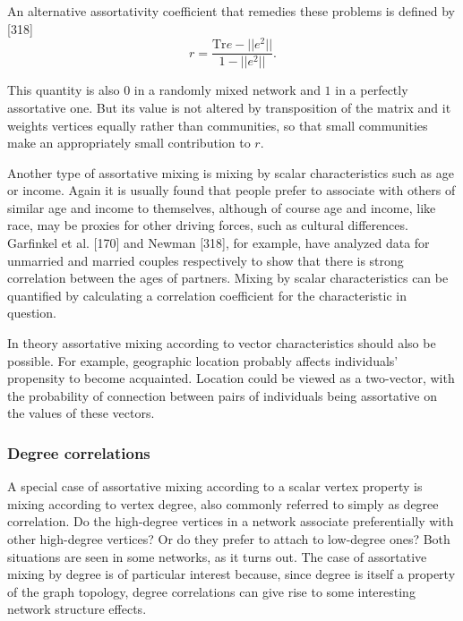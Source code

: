       An alternative assortativity coefficient that remedies these problems is defined by [318]
      \begin{equation}
        r = \frac{\mbox{Tr}e - ||e^2||}{1 - ||e^2||}\mbox{.}
      \end{equation}

      This quantity is also $0$ in a randomly mixed network and $1$ in a perfectly assortative one. But its value is not altered by transposition of the matrix and it weights vertices equally rather than communities, so that small communities make an appropriately small contribution to $r$.
      
      Another type of assortative mixing is mixing by scalar characteristics such as age or income. Again it is usually found that people prefer to associate with others of similar age and income to themselves, although of course age and income, like race, may be proxies for other driving forces, such as cultural differences. Garfinkel et al. [170] and Newman [318], for example, have analyzed data for unmarried and married couples respectively to show that there is strong correlation between the ages of partners. Mixing by scalar characteristics can be quantified by calculating a correlation coefficient for the characteristic in question.
      
      In theory assortative mixing according to vector characteristics should also be possible. For example, geographic location probably affects individuals' propensity to become acquainted. Location could be viewed as a two-vector, with the probability of connection between pairs of individuals being assortative on the values of these vectors.
            
    \subsubsection{Degree correlations}
    
      A special case of assortative mixing according to a scalar vertex property is mixing according to vertex degree, also commonly referred to simply as degree correlation. Do the high-degree vertices in a network associate preferentially with other high-degree vertices? Or do they prefer to attach to low-degree ones? Both situations are seen in some networks, as it turns out. The case of assortative mixing by degree is of particular interest because, since degree is itself a property of the graph topology, degree correlations can give rise to some interesting network structure effects.
      
